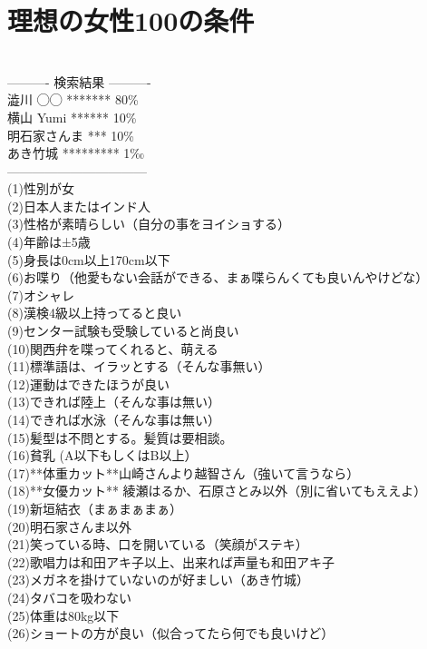 \section{理想の女性100の条件}
　\\
---------- 検索結果 ---------- \\
    澁川 ◯◯ *******  80\%\\
    横山 Yumi ******  10\%\\
    明石家さんま *** 10\%\\
    あき竹城 *********  1‰\\
---------------------------------\\
(1)性別が女\\
(2)日本人またはインド人\\
(3)性格が素晴らしい（自分の事をヨイショする）\\
(4)年齢は±5歳\\
(5)身長は0cm以上170cm以下\\
(6)お喋り（他愛もない会話ができる、まぁ喋らんくても良いんやけどな）\\
(7)オシャレ\\
(8)漢検4級以上持ってると良い\\
(9)センター試験も受験していると尚良い\\
(10)関西弁を喋ってくれると、萌える\\
(11)標準語は、イラッとする（そんな事無い）\\
(12)運動はできたほうが良い\\
(13)できれば陸上（そんな事は無い）\\
(14)できれば水泳（そんな事は無い）\\
(15)髪型は不問とする。髪質は要相談。\\
(16)貧乳  (A以下もしくはB以上）\\
(17)**体重カット**山崎さんより越智さん（強いて言うなら）\\
(18)**女優カット** 綾瀬はるか、石原さとみ以外（別に省いてもええよ）\\
(19)新垣結衣（まぁまぁまぁ）\\
(20)明石家さんま以外\\
(21)笑っている時、口を開いている（笑顔がステキ）\\
(22)歌唱力は和田アキ子以上、出来れば声量も和田アキ子\\
(23)メガネを掛けていないのが好ましい（あき竹城）\\
(24)タバコを吸わない\\
(25)体重は80kg以下\\
(26)ショートの方が良い（似合ってたら何でも良いけど）\\
